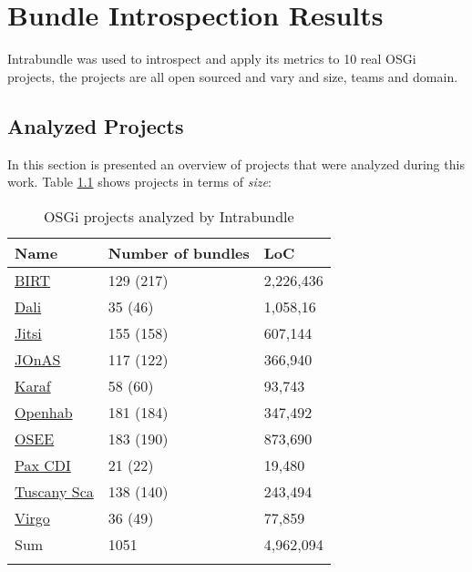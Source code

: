 \chapter{Bundle Introspection Results}

Intrabundle was used to introspect and apply its metrics to 10 real OSGi projects, the projects are all open sourced and vary and size, teams and domain. 

\section{Analyzed Projects}
In this section is presented an overview of projects that were analyzed during this work. Table \ref{osgi-analyzed-projects} shows projects in terms of \emph{size}:

\begin{table}[h]
\caption{OSGi projects analyzed by Intrabundle}
\label{osgi-analyzed-projects}
\begin{center}      
    \begin{tabular}{  p{5cm} | p{5cm} | p{4cm}}
    \Xhline{2\arrayrulewidth}
    Name & Number of bundles & LoC \\  \hline
    \href{http://eclipse.org/birt/}{BIRT} & 129 (217) & 2,226,436\\ \hline
    \href{https://eclipse.org/webtools/dali/}{Dali} & 35 (46) & 1,058,16\\ \hline
    \href{https://jitsi.org/}{Jitsi} & 155 (158) & 607,144\\ \hline
    \href{http://jonas.ow2.org/xwiki/bin/view/Main/}{JOnAS} & 117 (122) & 366,940\\ \hline
    \href{http://karaf.apache.org/}{Karaf} & 58 (60) & 93,743\\ \hline
    \href{http://www.openhab.org/}{Openhab} & 181 (184) & 347,492\\ \hline
    \href{https://eclipse.org/osee/}{OSEE} & 183 (190) & 873,690\\ \hline
    \href{http://team.ops4j.org/wiki/display/paxcdi/}{Pax CDI} & 21 (22) & 19,480\\ \hline 
    \href{http://tuscany.apache.org/sca-overview.html}{Tuscany Sca} & 138 (140) & 243,494\\ \hline
    \href{http://www.eclipse.org/virgo/}{Virgo} & 36 (49) & 77,859\\ \hline
    Sum & 1051 & 4,962,094 \\
   \Xhline{2\arrayrulewidth}

    \end{tabular}
\end{center}
\end{table}
\FloatBarrier 

